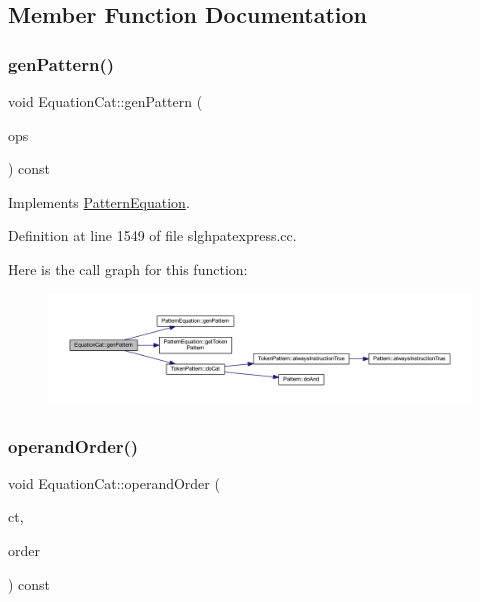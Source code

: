 \subsection{Member Function Documentation}
\mbox{\label{class_equation_cat_ad5322f8ad27062ff5c195c392334b299}} 
\subsubsection{\texorpdfstring{genPattern()}{genPattern()}}
{\footnotesize\ttfamily void Equation\+Cat\+::gen\+Pattern (\begin{DoxyParamCaption}\item[{const vector$<$ \mbox{\hyperlink{class_token_pattern}{Token\+Pattern}} $>$ \&}]{ops }\end{DoxyParamCaption}) const\hspace{0.3cm}{\ttfamily [virtual]}}



Implements \mbox{\hyperlink{class_pattern_equation_a9838e5bfe5b6013c99567628a6364bfd}{Pattern\+Equation}}.



Definition at line 1549 of file slghpatexpress.\+cc.

Here is the call graph for this function\+:
\nopagebreak
\begin{figure}[H]
\begin{center}
\leavevmode
\includegraphics[width=350pt]{class_equation_cat_ad5322f8ad27062ff5c195c392334b299_cgraph}
\end{center}
\end{figure}
\mbox{\label{class_equation_cat_a3504199664351bffd3aeb8b6e8246fec}} 
\subsubsection{\texorpdfstring{operandOrder()}{operandOrder()}}
{\footnotesize\ttfamily void Equation\+Cat\+::operand\+Order (\begin{DoxyParamCaption}\item[{\mbox{\hyperlink{class_constructor}{Constructor}} $\ast$}]{ct,  }\item[{vector$<$ \mbox{\hyperlink{class_operand_symbol}{Operand\+Symbol}} $\ast$ $>$ \&}]{order }\end{DoxyParamCaption}) const\hspace{0.3cm}{\ttfamily [virtual]}}



